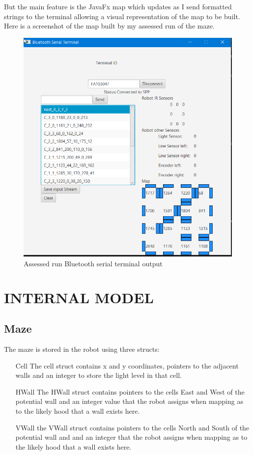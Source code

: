 \documentclass[11pt,a4paper,titlepage]{article}
\begin{document}
            But the main feature is the JavaFx map which updates as I send formatted strings to the terminal allowing a visual representation of the map to be built. 
            Here is a screenshot of the map built by my assessed run of the maze.
            \begin{figure}[H]
                \caption{Assessed run Bluetooth serial terminal output}
                \includegraphics[width=17cm,keepaspectratio]{assessedRun}
            \end{figure}
    \section{INTERNAL MODEL}
        \subsection{Maze}
            The maze is stored in the robot using three structs:
            
            \begin{itemize}
                \item[Cell] The cell struct contains x and y coordinates, pointers to the adjacent walls and an integer to store the light level in that cell.
                \item[HWall] The HWall struct contains pointers to the cells East and West of the potential wall and an integer value that the robot assigns when mapping as to the likely hood that a wall exists here.
                \item[VWall] the VWall struct contains pointers to the cells North and South of the potential wall and and an integer that the robot assigns when mapping as to the likely hood that a wall exists here.
            \end{itemize}
\end{document}
